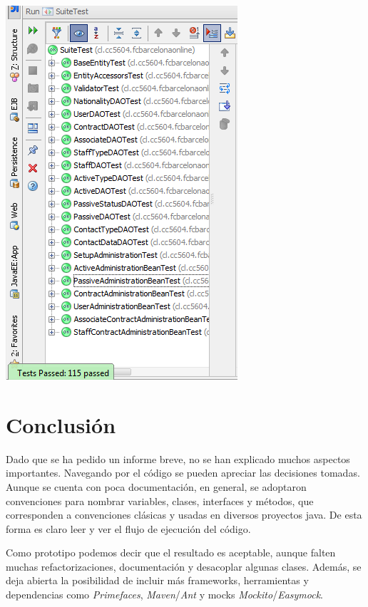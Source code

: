 \documentclass[letter]{article}
\begin{document}
\begin{center}
  \includegraphics{images/tests.png}
\end{center}

\section{Conclusión}

Dado que se ha pedido un informe breve, no se han explicado muchos aspectos importantes. Navegando por el código se pueden apreciar las decisiones tomadas. Aunque se cuenta con poca documentación, en general, se adoptaron convenciones para nombrar variables, clases, interfaces y métodos, que corresponden a convenciones clásicas y usadas en diversos proyectos java. De esta forma es claro leer y ver el flujo de ejecución del código.

Como prototipo podemos decir que el resultado es aceptable, aunque falten muchas refactorizaciones, documentación y desacoplar algunas clases. Además, se deja abierta la posibilidad de incluir más frameworks, herramientas y dependencias como \textit{Primefaces}, \textit{Maven}/\textit{Ant} y mocks \textit{Mockito}/\textit{Easymock}.
\end{document}

